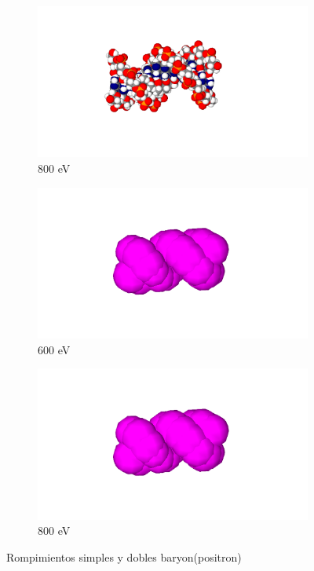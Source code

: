 \begin{figure}
\begin{subfigure}{.5\textwidth}
  \includegraphics[width=.78\linewidth]{./Figures/1fzxvdw.png}
  \caption{800 eV}
  \label{fig:sub44}
\end{subfigure}
\begin{subfigure}{.5\textwidth}
  \centering
  \includegraphics[width=.78\linewidth]{./Figures/1fzxba.png}
  \caption{600 eV}
  \label{fig:sub55}
\end{subfigure}%
\begin{subfigure}{.5\textwidth}
  \centering
  \includegraphics[width=.78\linewidth]{./Figures/1fzxba.png}
  \caption{800 eV}
  \label{fig:sub66}
\end{subfigure}
\caption[Rompimientos simples y dobles electrón(positron)]{Rompimientos simples y dobles baryon(positron)}
\end{figure}




